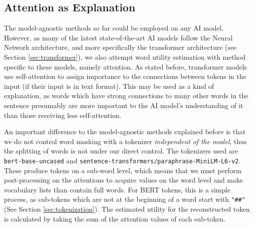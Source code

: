 \subsection{Attention as Explanation}
The model-agnostic methods so far could be employed on any AI model.
However, as many of the latest state-of-the-art AI models follow the Neural Network architecture, and more specifically the transformer architecture (see Section \ref{sec:transformer}), we also attempt word utility estimation with method specific to these models, namely attention.
As stated before, transformer models use self-attention to assign importance to the connections between tokens in the input (if their input is in text format).
This may be used as a kind of explanation, as words which have strong connections to many other words in the sentence presumably are more important to the AI model's understanding of it than those receiving less self-attention.

An important difference to the model-agnostic methods explained before is that we do not control word masking with a tokenizer \textit{independent of the model}, thus the splitting of words is not under our direct control.
The tokenizers used are \texttt{bert-base-uncased} and \texttt{sentence-transformers/paraphrase-MiniLM-L6-v2}.
These produce tokens on a sub-word level, which means that we must perform post-processing on the attentions to acquire values on the word level and make vocabulary lists than contain full words.
For BERT tokens, this is a simple process, as sub-tokens which are not at the beginning of a word start with \texttt{"\#\#"}(See Section \ref{sec:tokenization}).
The estimated utility for the reconstructed token is calculated by taking the sum of the attention values of each sub-token.

